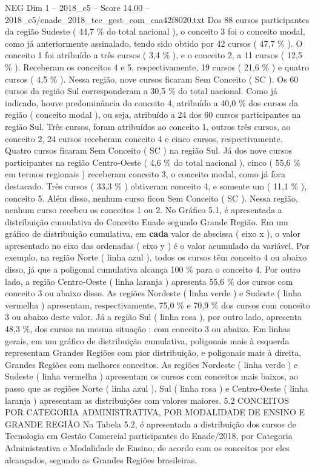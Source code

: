 \begin{textsample}{NEG Dim 1 – 2018\_c5 – Score 14.00 – 2018\_c5/enade\_2018\_tec\_gest\_com\_caa42f8020.txt}
Dos 88 cursos participantes da região Sudeste ( 44,7 \% do total nacional ), o conceito 3 foi o conceito modal, como já anteriormente assinalado, tendo sido obtido por 42 cursos ( 47,7 \% ).
O conceito 1 foi atribuído a três cursos ( 3,4 \% ), e o conceito 2, a 11 cursos ( 12,5 \% ).
Receberam os conceitos 4 e 5, respectivamente, 19 cursos ( 21,6 \% ) e quatro cursos ( 4,5 \% ).
Nessa região, nove cursos ficaram Sem Conceito ( SC ).
Os 60 cursos da região Sul corresponderam a 30,5 \% do total nacional.
Como já indicado, houve predominância do conceito 4, atribuído a 40,0 \% dos cursos da região ( conceito modal ), ou seja, atribuído a 24 dos 60 cursos participantes na região Sul.
Três cursos, foram atribuídos ao conceito 1, outros três cursos, ao conceito 2, 24 cursos receberam conceito 4 e cinco cursos, respectivamente.
Quatro cursos ficaram Sem Conceito ( SC ) na região Sul.
Já dos nove cursos participantes na região Centro-Oeste ( 4,6 \% do total nacional ), cinco ( 55,6 \% em termos regionais ) receberam conceito 3, o conceito modal, como já fora destacado.
Três cursos ( 33,3 \% ) obtiveram conceito 4, e somente um ( 11,1 \% ), conceito 5.
Além disso, nenhum curso ficou Sem Conceito ( SC ).
Nessa região, nenhum curso recebeu os conceitos 1 ou 2.
No Gráfico 5.1, é apresentada a distribuição cumulativa do Conceito Enade segundo Grande Região.
Em um gráfico de distribuição cumulativa, em \textbf{cada} valor de abscissa ( eixo x ), o valor apresentado no eixo das ordenadas ( eixo y ) é o valor acumulado da variável.
Por exemplo, na região Norte ( linha azul ), todos os cursos têm conceito 4 ou abaixo disso, já que a poligonal cumulativa alcança 100 \% para o conceito 4.
Por outro lado, a região Centro-Oeste ( linha laranja ) apresenta 55,6 \% dos cursos com conceito 3 ou abaixo disso.
As regiões Nordeste ( linha verde ) e Sudeste ( linha vermelha ) apresentam, respectivamente, 75,0 \% e 70,9 \% dos cursos com conceito 3 ou abaixo deste valor.
Já a região Sul ( linha rosa ), por outro lado, apresenta 48,3 \%, dos cursos na mesma situação : com conceito 3 ou abaixo.
Em linhas gerais, em um gráfico de distribuição cumulativa, poligonais mais à esquerda representam Grandes Regiões com pior distribuição, e poligonais mais à direita, Grandes Regiões com melhores conceitos.
As regiões Nordeste ( linha verde ) e Sudeste ( linha vermelha ) apresentam os cursos com conceitos mais baixos, ao passo que as regiões Norte ( linha azul ), Sul ( linha rosa ) e Centro-Oeste ( linha laranja ) apresentam as distribuições com valores maiores. 5.2 CONCEITOS POR CATEGORIA ADMINISTRATIVA, POR MODALIDADE DE ENSINO E GRANDE REGIÃO Na Tabela 5.2, é apresentada a distribuição dos cursos de Tecnologia em Gestão Comercial participantes do Enade/2018, por Categoria Administrativa e Modalidade de Ensino, de acordo com os conceitos por eles alcançados, segundo as Grandes Regiões brasileiras.

\end{textsample}
